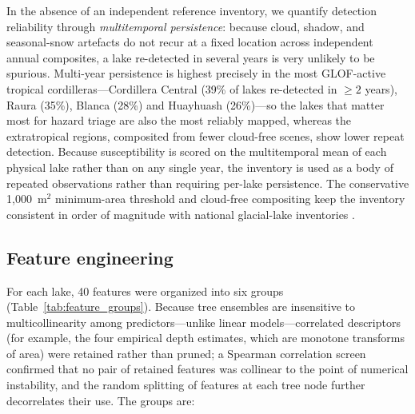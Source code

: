 \documentclass[pdflatex,sn-basic]{sn-jnl}%
\begin{document}
In the absence of an independent reference inventory, we quantify
detection reliability through \emph{multitemporal persistence}: because
cloud, shadow, and seasonal-snow artefacts do not recur at a fixed
location across independent annual composites, a lake re-detected in
several years is very unlikely to be spurious. Multi-year persistence is
highest precisely in the most GLOF-active tropical cordilleras---Cordillera
Central (39\% of lakes re-detected in $\geq\!2$ years), Raura (35\%),
Blanca (28\%) and Huayhuash (26\%)---so the lakes that matter most for
hazard triage are also the most reliably mapped, whereas the extratropical
regions, composited from fewer cloud-free scenes, show lower repeat
detection. Because susceptibility is scored on the multitemporal mean of
each physical lake rather than on any single year, the inventory is used as
a body of repeated observations rather than requiring per-lake persistence.
The conservative 1{,}000~m$^2$ minimum-area threshold and cloud-free
compositing keep the inventory consistent in order of magnitude with
national glacial-lake inventories \citep{Emmer2022,INAIGEM2018}.

\subsection{Feature engineering}

For each lake, 40 features were organized into six
groups (Table~\ref{tab:feature_groups}). Because tree ensembles are
insensitive to multicollinearity among predictors---unlike linear
models---correlated descriptors (for example, the four empirical depth
estimates, which are monotone transforms of area) were retained rather
than pruned; a Spearman correlation screen confirmed that no pair of
retained features was collinear to the point of numerical instability, and
the random splitting of features at each tree node further decorrelates
their use. The groups are:
\end{document}
